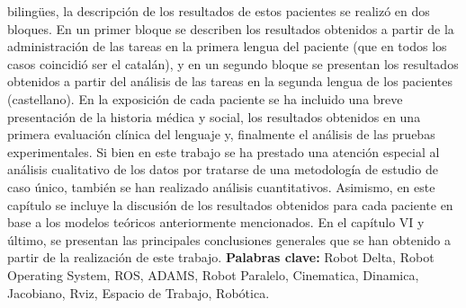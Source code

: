 bilingües, la descripción de los resultados de estos pacientes se realizó en dos
bloques. En un primer bloque se describen los resultados obtenidos a partir de la
administración de las tareas en la primera lengua del paciente (que en todos los
casos coincidió ser el catalán), y en un segundo bloque se presentan los resultados
obtenidos a partir del análisis de las tareas en la segunda lengua de los pacientes
(castellano). En la exposición de cada paciente se ha incluido una breve
presentación de la historia médica y social, los resultados obtenidos en una
primera evaluación clínica del lenguaje y, finalmente el análisis de las pruebas
experimentales. Si bien en este trabajo se ha prestado una atención especial al
análisis cualitativo de los datos por tratarse de una metodología de estudio de caso
único, también se han realizado análisis cuantitativos. Asimismo, en este capítulo
se incluye la discusión de los resultados obtenidos para cada paciente en base a
los modelos teóricos anteriormente mencionados.
En el capítulo VI y último, se presentan las principales conclusiones
generales que se han obtenido a partir de la realización de este trabajo.
\vfill
\noindent\textbf{Palabras clave:} Robot Delta, Robot Operating System, ROS, ADAMS, Robot Paralelo, Cinematica, Dinamica, Jacobiano, Rviz, Espacio de Trabajo, Robótica.
